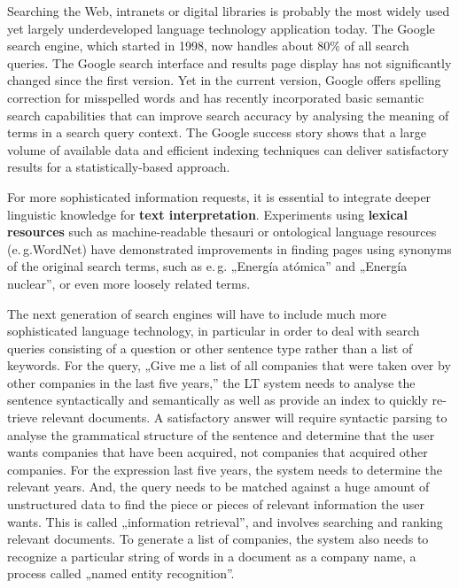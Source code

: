 \begin{multicols}{2}
Searching the Web, intranets or digital libraries is probably the most widely used yet largely underdeveloped language technology application today. The Google search engine, which started in 1998, now handles about 80\% of all search queries. The Google search interface and results page display has not significantly changed since the first version. Yet in the current version, Google offers spelling correction for misspelled words and has recently incorporated basic semantic search capabilities that can improve search accuracy by analysing the meaning of terms in a search query context.  The Google success story shows that a large volume of available data and efficient indexing techniques can deliver satisfactory results for a statistically-based approach.

For more sophisticated information requests, it is essential to integrate deeper linguistic knowledge for \textbf{text interpretation}. Experiments using \textbf{lexical resources} such as machine-readable thesauri or ontological language resources (e.\,g.WordNet) have demonstrated improvements in finding pages using synonyms of the original search terms, such as e.\,g. „Energía atómica” and „Energía nuclear”, or even more loosely related terms. 


The next generation of search engines will have to include much more sophisticated language technology, in particular in order to deal with search queries consisting of a question or other sentence type rather than a list of keywords. For the query, „Give me a list of all companies that were taken over by other companies in the last five years,” the LT system needs to analyse the sentence syntactically and semantically as well as provide an index to quickly re-trieve relevant documents. A satisfactory answer will require syntactic parsing to analyse the grammatical structure of the sentence and determine that the user wants companies that have been acquired, not companies that acquired other companies. For the expression last five years, the system needs to determine the relevant years. And, the query needs to be matched against a huge amount of unstructured data to find the piece or pieces of relevant information the user wants. This is called „information retrieval”, and involves searching and ranking relevant documents. To generate a list of companies, the system also needs to recognize a particular string of words in a document as a company name, a process called „named entity recognition”.


\end{multicols}
